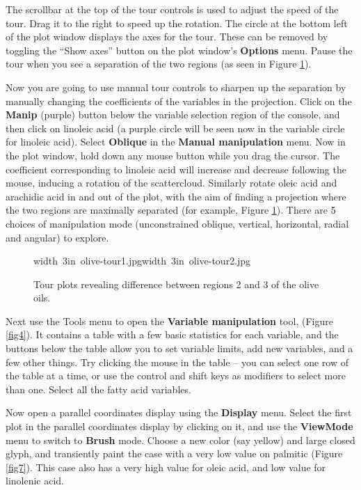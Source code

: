 \documentclass[11pt]{article}
\begin{document}
The scrollbar at the top of the tour controls is used to adjust the
speed of the tour.  Drag it to the right to speed up the rotation.
The circle at the bottom left of the plot window displays the axes
for the tour. These can be removed by toggling the ``Show axes''
button on the plot window's {\bf Options} menu.  Pause the tour when
you see a separation of the two regions (as seen in Figure
\ref{fig6}).

Now you are going to use manual tour controls to sharpen up the
separation by manually changing the coefficients of the variables in
the projection.  Click on the {\bf Manip} (purple) button below the
variable selection region of the console, and then click on linoleic
acid (a purple circle will be seen now in the variable circle for
linoleic acid).  Select {\bf Oblique} in the {\bf Manual
manipulation} menu.  Now in the plot window, hold down any mouse
button while you drag the cursor. The coefficient corresponding to
linoleic acid will increase and decrease following the mouse,
inducing a rotation of the scattercloud.  Similarly rotate oleic acid
and arachidic acid in and out of the plot, with the aim of finding a
projection where the two regions are maximally separated (for
example, Figure \ref{fig6}).  There are 5 choices of manipulation
mode (unconstrained oblique, vertical, horizontal, radial and
angular) to explore.

\begin{figure}[htp]
\hbox{\pdfimage width 3in {olive-tour1.jpg}\pdfimage width 3in {olive-tour2.jpg}}
\caption{Tour plots revealing difference between regions 2 and 3 of the
olive oils.}
\label{fig6}
\end{figure}

Next use the Tools menu to open the {\bf Variable manipulation} tool,
(Figure \ref{fig4}).  It contains a table with a few basic statistics
for each variable, and the buttons below the table allow you to set
variable limits, add new variables, and a few other things.  Try
clicking the mouse in the table -- you can select one row of the
table at a time, or use the control and shift keys as modifiers to
select more than one.  Select all the fatty acid variables.

Now open a parallel coordinates display using the {\bf Display} menu.
Select the first plot in the parallel coordinates display by
clicking on it, and use the {\bf ViewMode} menu to switch to {\bf
Brush} mode. Choose a new color (say yellow) and large closed glyph,
and transiently paint the case with a very low value on palmitic
(Figure \ref{fig7}). This case also has a very high value for oleic
acid, and low value for linolenic acid.
\end{document}
